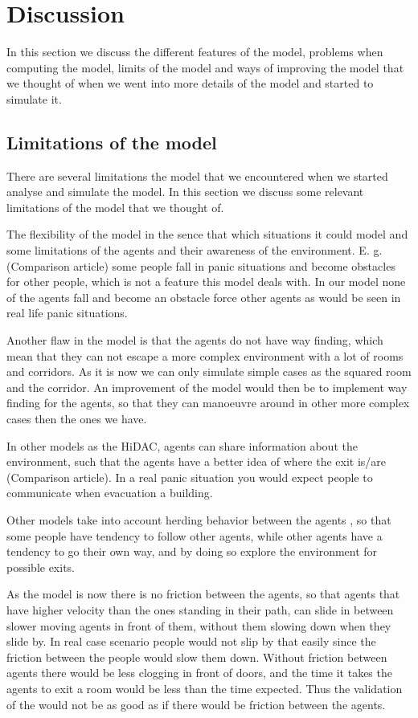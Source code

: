 \section{Discussion}\label{sec:discussion}
In this section we discuss the different features of the model, problems when computing the model,
limits of the model and ways of improving the model that we thought of when we went into more
details of the model and started to simulate it.

\subsection{Limitations of the model}

There are several limitations the model that we encountered when we started analyse and simulate the
model. In this section we discuss some relevant limitations of the model that we thought of.

The flexibility of the model in the sence that which situations it could model and some limitations
of the agents and their awareness of the environment.
E. g. (Comparison article) some people fall in panic situations and become obstacles for other people,
which is not a feature this model deals with. In our model none of the agents fall and become an obstacle force
other agents as would be seen in real life panic situations.

Another flaw in the model is that the agents do not have way finding, which mean that they can not escape
a more complex environment with a lot of rooms and corridors. As it is now we can only simulate simple
cases as the squared room and the corridor.
An improvement of the model would then be to implement way finding for the agents, so that they can manoeuvre
around in other more complex cases then the ones we have.

In other models as the HiDAC, agents can share information about the environment, such that the agents have a better
idea of where the exit is/are (Comparison article). In a real panic situation you would expect people to communicate when
evacuation a building.

Other models take into account herding behavior between the agents \cite{helbing00}, so that some people have tendency to
follow other agents, while other agents have a tendency to go their own way, and by doing so explore the environment
for possible exits.

As the model is now there is no friction between the agents, so that agents that have higher velocity than
the ones standing in their path, can slide in between slower moving agents in front of them, without them slowing
down when they slide by. In real case scenario people would not slip by that easily since the friction between
the people would slow them down.
Without friction between agents there would be less clogging in front of doors, and the time it takes the agents
to exit a room would be less than the time expected. Thus the validation of the would not be as good as if there
would be friction between the agents.

